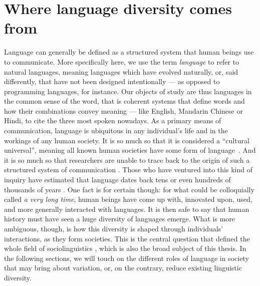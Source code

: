 \documentclass[../thesis.tex]{subfiles}
\begin{document}
\chapter{Where language diversity comes from}
\label{ch:origins_lang_diversity}

Language can generally be defined as
a structured system that human beings use to communicate.
More specifically here, we use the term \emph{language} to refer to natural languages,
meaning languages which have evolved naturally, or, said differently, that have not been
designed intentionally --- as opposed to programming languages, for instance. Our
objects of study are thus languages in the common sense of the word, that is coherent
systems that define words and how their combinations convey meaning --- like English,
Mandarin Chinese or Hindi, to cite the three most spoken nowadays. As a primary means of
communication, language
is ubiquitous in any individual's life and in the workings of any human society. It is
so much so that it is considered a ``cultural universal'', meaning all known human
societies have some form of
language~\cite{GreenbergLanguageUniversals2020,BrownDonaldHumanUniversals1991,}. And it
is so much so that researchers are unable to trace back to the origin of such a
structured system of communication
\cite{MullerLectureIX1861,StamInquiriesOrigin1976,GibsonOxfordHandbook2011,HauserMysteryLanguage2014}.
Those who have ventured into this kind of inquiry have estimated that language dates
back tens or even hundreds of thousands of years
\cite{NicholsOriginDispersal1998,ChomskyLanguageMind2004,BothaCradleLanguage2009,DediuAntiquityLanguage2013}.
One fact is for certain though: for what could be colloquially called \emph{a very long
time}, human beings have come up with, innovated upon, used, and more generally
interacted with languages. It is then safe to say that human history must have seen a
huge diversity of languages emerge. What is more ambiguous, though, is how this
diversity is shaped through individuals' interactions, as they form societies. This is
the central question that defined the whole field of sociolinguistics
\cite{LabovSociolinguisticPatterns1973,TrudgillSociolinguisticsIntroduction2000,ChambersSociolinguisticTheory2007,WardhaughIntroductionSociolinguistics2008,LabovPrinciplesLinguistic2001},
which is also the broad subject of this thesis. In the following sections, we will touch
on the different roles of language in society that may bring about variation, or, on the
contrary, reduce existing linguistic diversity.
\end{document}
